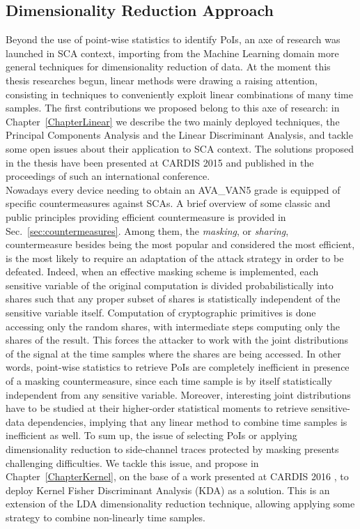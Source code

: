 \subsection{Dimensionality Reduction Approach}\label{sec:dim_red_objective}
Beyond the use of point-wise statistics to identify PoIs, an axe of research was launched in SCA context, importing from the Machine Learning domain more general techniques for dimensionality reduction of data. At the moment this thesis researches begun, linear methods were drawing a raising attention, consisting in techniques to conveniently exploit linear combinations of many time samples. The first contributions we proposed belong to this axe of research: in Chapter~\ref{ChapterLinear} we describe the two mainly deployed techniques, the Principal Components Analysis and the Linear Discriminant Analysis, and tackle some open issues about their application to SCA context. The solutions proposed in the thesis have been presented at CARDIS 2015 \cite{Cagli2016} and published in the proceedings of such an international conference.\\

Nowadays every device needing to obtain an AVA\_VAN5 grade is equipped of specific countermeasures against SCAs. A brief overview of some classic and public principles providing efficient countermeasure is provided in Sec.~\ref{sec:countermeasures}. Among them, the \emph{masking}, or \emph{sharing}, countermeasure besides being the most popular and considered the most efficient, is the most likely to require an adaptation of the attack strategy in order to be defeated. Indeed, when an effective masking scheme is implemented, each sensitive variable of the original computation is divided probabilistically into shares such that any proper subset
of shares is statistically independent of the sensitive variable itself. Computation of cryptographic primitives is done
accessing only the random shares, with intermediate steps computing only the shares of the result. This forces the attacker to work with the joint distributions of the signal at the time samples where the shares are being accessed. In other words, point-wise statistics to retrieve PoIs are completely inefficient in presence of a masking countermeasure, since each time sample is by itself statistically independent from any sensitive variable. Moreover, interesting joint distributions have to be studied at their higher-order statistical moments to retrieve sensitive-data dependencies, implying that any linear method to combine time samples is inefficient as well. To sum up, the issue of selecting PoIs or applying dimensionality reduction to side-channel traces protected by masking presents challenging difficulties. We tackle this issue, and propose in Chapter~\ref{ChapterKernel}, on the base of a work presented at CARDIS 2016 \cite{cagli2016kernel}, to deploy Kernel Fisher Discriminant Analysis (KDA) as a solution. This is an extension of the LDA dimensionality reduction technique, allowing applying some strategy to combine non-linearly time samples. 

